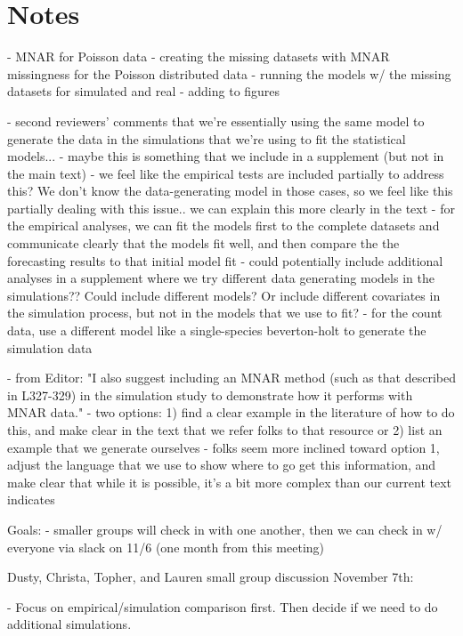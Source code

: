 \documentclass{article}
\begin{document}
\section{Notes}
- MNAR for Poisson data 
    - creating the missing datasets with MNAR missingness for the Poisson distributed data
    - running the models w/ the missing datasets for simulated and real 
    - adding to figures

- second reviewers' comments that we're essentially using the same model to generate the data in the simulations that we're using to fit the statistical models... 
    - maybe this is something that we include in a supplement (but not in the main text)
    - we feel like the empirical tests are included partially to address this? We don't know the data-generating model in those cases, so we feel like this partially dealing with this issue.. we can explain this more clearly in the text
    - for the empirical analyses, we can fit the models first to the complete datasets and communicate clearly that the models fit well, and then compare the the forecasting results to that initial model fit 
    - could potentially include additional analyses in a supplement where we try different data generating models in the simulations?? Could include different models? Or include different covariates in the simulation process, but not in the models that we use to fit? 
        - for the count data, use a different model like a single-species beverton-holt to generate the simulation data  

- from Editor: "I also suggest including an MNAR method (such as that described in L327-329) in the simulation study to demonstrate how it performs with MNAR data." 
    - two options: 1) find a clear example in the literature of how to do this, and make clear in the text that we refer folks to that resource or 2) list an example that we generate ourselves
    - folks seem more inclined toward option 1, adjust the language that we use to show where to go get this information, and make clear that while it is possible, it's a bit more complex than our current text indicates


Goals: 
- smaller groups will check in with one another, then we can check in w/ everyone via slack on 11/6 (one month from this meeting)

Dusty, Christa, Topher, and Lauren small group discussion November 7th: 

- Focus on empirical/simulation comparison first. Then decide if we need to do additional simulations.
\end{document}
